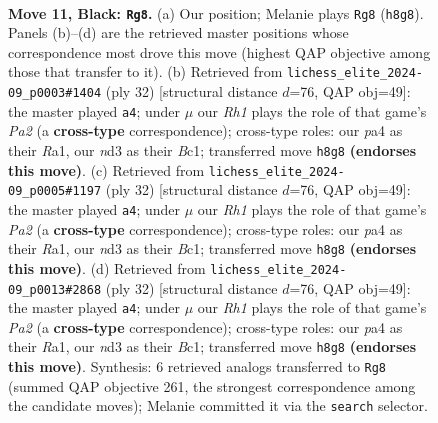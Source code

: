 \documentclass[11pt]{article}
\begin{document}
\clearpage

\begin{figure}[p]\centering
\begin{subfigure}{0.46\textwidth}\centering
\resizebox{\linewidth}{!}{%
\newchessgame
\chessboard[
  setfen={rn1kbb1r/1p3ppp/p3pn2/2P5/P1B5/3NP3/1P3PPP/RNB2RK1 b - - 3 11},
  showmover=false,
  pgfstyle=straightmove, color=movearrow, markmove={h8-g8}
]}
\caption{}
\end{subfigure}\hfill
\begin{subfigure}{0.46\textwidth}\centering
\resizebox{\linewidth}{!}{%
\newchessgame
\chessboard[
  setfen={r1b2rk1/5ppp/p3pn2/1pb5/8/3BPN2/PP3PPP/R1BR2K1 w - - 0 17},
  showmover=false,
  pgfstyle=straightmove, color=movearrow, markmove={a2-a4}
]}
\caption{}
\end{subfigure}
\\[4pt]
\begin{subfigure}{0.46\textwidth}\centering
\resizebox{\linewidth}{!}{%
\newchessgame
\chessboard[
  setfen={r1b2rk1/5ppp/p3pn2/1pb5/8/3BPN2/PP3PPP/R1BR2K1 w - - 0 17},
  showmover=false,
  pgfstyle=straightmove, color=movearrow, markmove={a2-a4}
]}
\caption{}
\end{subfigure}\hfill
\begin{subfigure}{0.46\textwidth}\centering
\resizebox{\linewidth}{!}{%
\newchessgame
\chessboard[
  setfen={r1b2rk1/5ppp/p3pn2/1pb5/8/3BPN2/PP3PPP/R1BR2K1 w - - 0 17},
  showmover=false,
  pgfstyle=straightmove, color=movearrow, markmove={a2-a4}
]}
\caption{}
\end{subfigure}
\caption{\textbf{Move 11, Black: \texttt{Rg8}.} (a) Our position; Melanie plays \texttt{Rg8} (\texttt{h8g8}). Panels (b)--(d) are the retrieved master positions whose correspondence most drove this move (highest QAP objective among those that transfer to it). (b) Retrieved from \texttt{lichess\_elite\_2024-09\_p0003\#1404} (ply 32) [structural distance $d$=76, QAP obj=49]: the master played \texttt{a4}; under $\mu$ our \emph{Rh1} plays the role of that game's \emph{Pa2} (a \textbf{cross-type} correspondence); cross-type roles: our \emph{p}a4 as their \emph{R}a1, our \emph{n}d3 as their \emph{B}c1; transferred move \texttt{h8g8} \textbf{(endorses this move)}. (c) Retrieved from \texttt{lichess\_elite\_2024-09\_p0005\#1197} (ply 32) [structural distance $d$=76, QAP obj=49]: the master played \texttt{a4}; under $\mu$ our \emph{Rh1} plays the role of that game's \emph{Pa2} (a \textbf{cross-type} correspondence); cross-type roles: our \emph{p}a4 as their \emph{R}a1, our \emph{n}d3 as their \emph{B}c1; transferred move \texttt{h8g8} \textbf{(endorses this move)}. (d) Retrieved from \texttt{lichess\_elite\_2024-09\_p0013\#2868} (ply 32) [structural distance $d$=76, QAP obj=49]: the master played \texttt{a4}; under $\mu$ our \emph{Rh1} plays the role of that game's \emph{Pa2} (a \textbf{cross-type} correspondence); cross-type roles: our \emph{p}a4 as their \emph{R}a1, our \emph{n}d3 as their \emph{B}c1; transferred move \texttt{h8g8} \textbf{(endorses this move)}. Synthesis: 6 retrieved analogs transferred to \texttt{Rg8} (summed QAP objective 261, the strongest correspondence among the candidate moves); Melanie committed it via the \texttt{search} selector.}

\end{figure}
\end{document}
